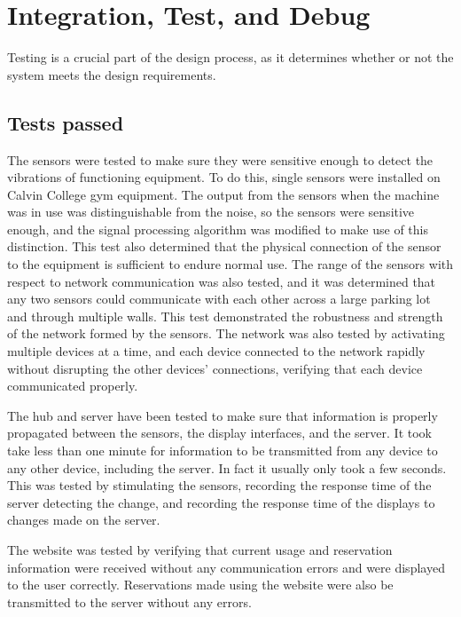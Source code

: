 \documentclass[PPFS.tex]{template/subfiles}
\begin{document}
\section{Integration, Test, and Debug}
Testing is a crucial part of the design process, as it determines whether or not the system meets the design requirements.

\subsection{Tests passed}
The sensors were tested to make sure they were sensitive enough to detect the vibrations of functioning equipment.  To do this, single sensors were installed on Calvin College gym equipment. The output from the sensors when the machine was in use was distinguishable from the noise, so the sensors were sensitive enough, and the signal processing algorithm was modified to make use of this distinction. This test also determined that the physical connection of the sensor to the equipment is sufficient to endure normal use. The range of the sensors with respect to network communication was also tested, and it was determined that any two sensors could communicate with each other across a large parking lot and through multiple walls. This test demonstrated the robustness and strength of the network formed by the sensors. The network was also tested by activating multiple devices at a time, and each device connected to the network rapidly without disrupting the other devices' connections, verifying that each device communicated properly.

The hub and server have been tested to make sure that information is properly propagated between the sensors, the display interfaces, and the server. It took take less than one minute for information to be transmitted from any device to any other device, including the server. In fact it usually only took a few seconds. This was tested by stimulating the sensors, recording the response time of the server detecting the change, and recording the response time of the displays to changes made on the server.

The website was tested by verifying that current usage and reservation information were received without any communication errors and were displayed to the user correctly. Reservations made using the website were also be transmitted to the server without any errors.
\end{document}
